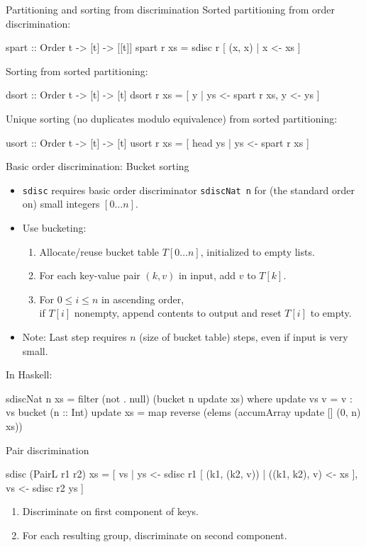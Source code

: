\documentclass{beamer}
\begin{document}
\begin{frame}[fragile]{Partitioning and sorting from discrimination}
  Sorted partitioning from order discrimination:
\begin{haskell}
spart :: Order t -> [t] -> [[t]]
spart r xs = sdisc r [ (x, x) | x <- xs ]
\end{haskell}
  Sorting from sorted partitioning:
\begin{haskell}
dsort :: Order t -> [t] -> [t]
dsort r xs = [ y | ys <- spart r xs, y <- ys ]
\end{haskell}
  Unique sorting (no duplicates modulo equivalence) from sorted
  partitioning:
\begin{haskell}
usort :: Order t -> [t] -> [t]
usort r xs = [ head ys | ys <- spart r xs ]
\end{haskell}
\end{frame}

\begin{frame}[fragile]{Basic order discrimination: Bucket sorting}
  \begin{itemize}
  \item \lstinline|sdisc| requires basic order discriminator \lstinline|sdiscNat n| for
    (the standard order on) small integers $[0 \ldots n]$.
  \item Use bucketing:
    \begin{enumerate}
    \item Allocate/reuse bucket table $T[0 \ldots n]$, initialized to empty
      lists.
    \item For each key-value pair $(k, v)$ in input, add $v$ to $T[k]$.
    \item For $0 \leq i \leq n$ in ascending order,\\
      if $T[i]$ nonempty, append contents to output and reset $T[i]$ to
      empty.
    \end{enumerate}
  \item Note: Last step requires $n$ (size of bucket table) steps, even if
    input is very small.
  \end{itemize}
  In Haskell:
\begin{haskell}
sdiscNat n xs = filter (not . null) (bucket n update xs)
   where update vs v = v : vs
bucket (n :: Int) update xs =
   map reverse (elems (accumArray update [] (0, n) xs))
\end{haskell}
\end{frame}

\begin{frame}[fragile]{Pair discrimination}
\begin{haskell}[style=long]
sdisc (PairL r1 r2) xs   =
  [ vs | ys <- sdisc r1 [ (k1, (k2, v)) | ((k1, k2), v) <- xs ],
         vs <- sdisc r2 ys ]
\end{haskell}
  \begin{enumerate}
  \item Discriminate on first component of keys.
  \item For each resulting group, discriminate on second component.
  \end{enumerate}
\end{frame}
\end{document}
